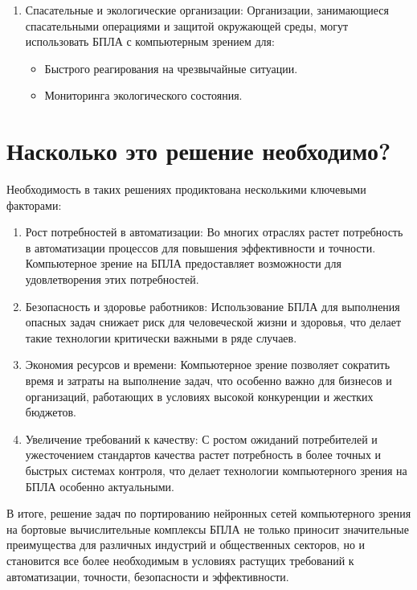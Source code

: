 \begin{enumerate}
        \item Спасательные и экологические организации:
        Организации, занимающиеся спасательными операциями и защитой окружающей среды, могут использовать БПЛА с компьютерным зрением для:
        \begin{itemize}
            \item Быстрого реагирования на чрезвычайные ситуации.
            \item Мониторинга экологического состояния.
        \end{itemize}
    \end{enumerate}
    
    \section*{Насколько это решение необходимо?}
    
    Необходимость в таких решениях продиктована несколькими ключевыми факторами:
    \begin{enumerate}
        \item Рост потребностей в автоматизации:
        Во многих отраслях растет потребность в автоматизации процессов для повышения эффективности и точности. Компьютерное зрение на БПЛА предоставляет возможности для удовлетворения этих потребностей.
        
        \item Безопасность и здоровье работников:
        Использование БПЛА для выполнения опасных задач снижает риск для человеческой жизни и здоровья, что делает такие технологии критически важными в ряде случаев.
        
        \item Экономия ресурсов и времени:
        Компьютерное зрение позволяет сократить время и затраты на выполнение задач, что особенно важно для бизнесов и организаций, работающих в условиях высокой конкуренции и жестких бюджетов.
        
        \item Увеличение требований к качеству:
        С ростом ожиданий потребителей и ужесточением стандартов качества растет потребность в более точных и быстрых системах контроля, что делает технологии компьютерного зрения на БПЛА особенно актуальными.
    \end{enumerate}

    В итоге, решение задач по портированию нейронных сетей компьютерного зрения на бортовые вычислительные комплексы БПЛА не только приносит значительные преимущества для различных индустрий и общественных секторов, но и становится все более необходимым в условиях растущих требований к автоматизации, точности, безопасности и эффективности.

